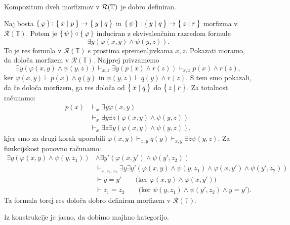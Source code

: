 \documentclass[../kategoricna_logika.tex]{subfiles}
\begin{document}
  \begin{lema}
    Kompozitum dveh morfizmov v $\mathcal{R}(\mathbb{T})$ je dobro definiran.
  \end{lema}
  \begin{dokaz}
    Naj bosta $\left\lbrace\,\varphi\,\right\rbrace : \left\lbrace\,x \mid p\,\right\rbrace \to \left\lbrace\,y \mid q\,\right\rbrace$ in
    $\left\lbrace\,\psi\,\right\rbrace : \left\lbrace\,y \mid q\,\right\rbrace \to \left\lbrace\,z \mid r\,\right\rbrace$ morfizma v
    $\mathcal{R}(\mathbb{T})$.  Potem je
    $\left\lbrace\,\psi\,\right\rbrace \circ \left\lbrace\,\varphi\,\right\rbrace$ induciran z ekvivalenčnim
    razredom formule
    \[ \exists y(\varphi(x,y) \land \psi(y,z)). \] To je res formula v
    $\mathcal{R}(\mathbb{T})$ s prostima spremenljivkama $x, z$.
    Pokazati moramo, da določa morfizem v
    $\mathcal{R}(\mathbb{T})$. Najprej privzamemo
    \[ \exists y(\varphi(x,y) \land \psi(y,z)) \vdash_{x,z}\exists
      y(p(x) \land r(z)) \vdash_{x,z}p(x) \land r(z), \] ker
    $\varphi(x,y) \vdash p(x) \land q(y)$ in
    $\psi(y,z) \vdash q(y) \land r(z)$.  S tem smo pokazali, da če
    določa morfizem, ga res določa od $\left\lbrace\,x \mid q\,\right\rbrace$ do
    $\left\lbrace\,z \mid r\,\right\rbrace$.  Za totalnost računamo:
    \begin{align*}
      p(x) &\vdash_{x} \exists y \varphi(x,y) \\
           &\vdash_{x} \exists y \exists z (\varphi(x,y) \land \psi(y,z)) \\
           &\vdash_{x} \exists z \exists y(\varphi(x,y) \land \psi(y,z)),
    \end{align*}
    kjer smo za drugi korak uporabili
    $\varphi(x,y) \vdash_{x,y} q(y) \vdash_{x,y} \exists z \psi(y,z)$.
    Za funk\-cij\-skost ponovno računamo:
    \begin{align*}
      \exists y(\varphi(x,y) \land \psi(y,z_{1})) &\land \exists y' (\varphi(x,y') \land \psi(y',z_{2})) \\
                                                  &\vdash_{x,z_{1}, z_{2}} \exists y \exists y' (\varphi(x,y) \land \psi(y,z_{1}) \land \varphi(x,y') \land \psi(y',z_{2})) \\
                                                  &\vdash y = y' \qquad \text{(ker $\varphi(x,y) \land \varphi(x,y')$)} \\
                                                  &\vdash z_{1} = z_{2} \qquad \text{(ker $\psi(y,z_{1}) \land \psi(y',z_{2}) \land y=y'$)}.
    \end{align*}
    Ta formula torej res določa dobro definiran morfizem v
    $\mathcal{R}(\mathbb{T})$.
  \end{dokaz}
\begin{opomba}
Iz konstrukcije je jasno, da dobimo majhno kategorijo.
\end{opomba}
\end{document}
